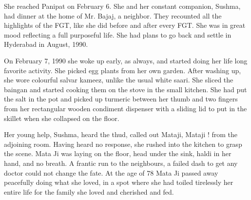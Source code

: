 She reached Panipat on February 6. She and her constant companion, Sushma,
had dinner at the home of Mr. Bajaj, a neighbor. They recounted all the
highlights of the FGT, like she did before and after every FGT. She was in
great mood reflecting a full purposeful life. She had plans to go back and
settle in Hyderabad in August, 1990. 

On February 7, 1990 she woke up early, as always, and started doing her
life long favorite activity. She picked egg plants from her own garden.
After washing up, she wore colourful salvar kameez, unlike the usual white
saari. She sliced the baingan and started cooking them on the stove in the
small kitchen. She had put the salt in the pot and picked up turmeric
between her thumb and two fingers from her rectangular wooden condiment
dispenser with a sliding lid to put in the skillet when she collapsed on
the floor. 

Her young help, Sushma, heard the thud, called out Mataji, Mataji ! from
the adjoining room. Having heard no response, she rushed into the kitchen
to grasp the scene. Mata Ji was laying on the floor, head under the sink,
haldi in her hand, and no breath. A frantic run to the neighbours,
a failed dash to get any doctor could not change the fate. At the age of
78 Mata Ji passed away peacefully doing what she loved, in a spot where
she had toiled tirelessly her entire life for the family she loved and
cherished and fed. 
